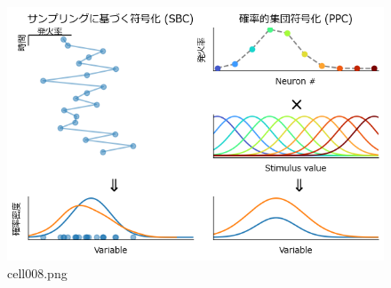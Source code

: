 \begin{figure}[ht]
	\centering
	\includegraphics[scale=0.8, max width=\linewidth]{./fig/bayesian-brain/neural-uncertainty-representation/cell008.png}
	\caption{cell008.png}
	\label{cell008.png}
\end{figure}
